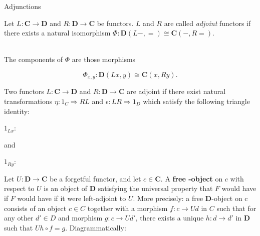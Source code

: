 \documentclass[tikz]{beamer}
\theoremstyle{definition}
\newcommand{\cat}[1]{\mathbf{#1}}
\begin{document}
\begin{frame}{Adjunctions}

   \begin{definition}[Adjunction]
        Let $L: \cat{C} \to \cat{D}$ and $R : \cat{D} \to \cat{C}$ be functors. $L$ and $R$ are called \textit{adjoint} functors if
        there exists a natural isomorphism $\Phi : \cat{D}(L-, =) \cong \cat{C}(-, R=)$.
   \end{definition}{}
\\
The components of $\Phi$ are those morphisms

\begin{equation*}
    \Phi_{x,y}: \cat{D}(Lx, y) \cong \cat{C}(x, Ry).
\end{equation*}
\end{frame}{}

\begin{frame}[fragile]

   \begin{definition}
    Two functors $L: \cat{C} \to \cat{D}$ and $R : \cat{D} \to \cat{C}$ are adjoint if there exist natural transformations $\eta : 1_C \Rightarrow RL $ and $\epsilon : LR \Rightarrow 1_D$ which satisfy the following triangle identity:

    \begin{center}
        $1_{Lx}:$ 
    \end{center}

    and
    \begin{center}
        $1_{Ry}:$ 
    \end{center}
   \end{definition}

\end{frame}

\begin{frame}[fragile]

Let $U: \cat{D} \to \cat{C}$ be a forgetful functor, and let $c \in \cat{C}$. A \textbf{free \cat{D}-object} on $c$ with respect to $U$
is an object of $\cat{D}$ satisfying the universal property that $F$ would have if $F$ would have if it were left-adjoint to $U$. More precisely: a free $\cat{D}$-object on c consists of an object $c \in C$ together with a morphism $f:c \to Ud$ in $C$ such that for any other $d' \in D$ and morphism $g:c \to Ud'$, there exists a unique $h:d \to d'$ in $\cat{D}$ such that $Uh \circ f = g$. Diagrammatically:

\begin{center}
\end{center}
\end{frame}
\end{document}
